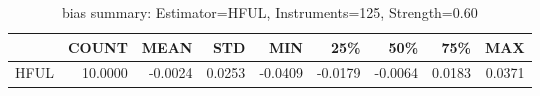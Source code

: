 \begin{table}[ht]
\centering
\caption{bias summary: Estimator=HFUL, Instruments=125, Strength=0.60}
\begin{tabular}{lrrrrrrrr}
\toprule
 & COUNT & MEAN & STD & MIN & 25\% & 50\% & 75\% & MAX \\
\midrule
HFUL & 10.0000 & -0.0024 & 0.0253 & -0.0409 & -0.0179 & -0.0064 & 0.0183 & 0.0371 \\
\bottomrule
\end{tabular}
\end{table}
